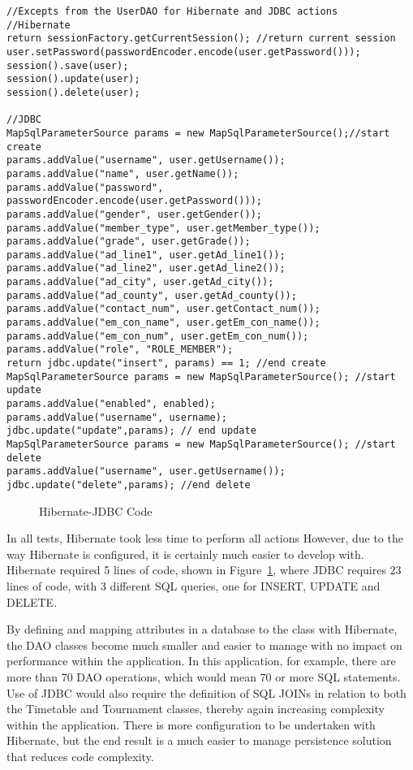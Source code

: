 \begin{lstlisting}
//Excepts from the UserDAO for Hibernate and JDBC actions
//Hibernate
return sessionFactory.getCurrentSession(); //return current session
user.setPassword(passwordEncoder.encode(user.getPassword()));
session().save(user);
session().update(user);	
session().delete(user);

//JDBC
MapSqlParameterSource params = new MapSqlParameterSource();//start create
params.addValue("username", user.getUsername());
params.addValue("name", user.getName());
params.addValue("password", passwordEncoder.encode(user.getPassword()));
params.addValue("gender", user.getGender());
params.addValue("member_type", user.getMember_type());
params.addValue("grade", user.getGrade());
params.addValue("ad_line1", user.getAd_line1());
params.addValue("ad_line2", user.getAd_line2());
params.addValue("ad_city", user.getAd_city());
params.addValue("ad_county", user.getAd_county());
params.addValue("contact_num", user.getContact_num());
params.addValue("em_con_name", user.getEm_con_name());
params.addValue("em_con_num", user.getEm_con_num());
params.addValue("role", "ROLE_MEMBER");
return jdbc.update("insert", params) == 1; //end create
MapSqlParameterSource params = new MapSqlParameterSource(); //start update
params.addValue("enabled", enabled);
params.addValue("username", username);
jdbc.update("update",params); // end update
MapSqlParameterSource params = new MapSqlParameterSource(); //start delete
params.addValue("username", user.getUsername());
jdbc.update("delete",params); //end delete
\end{lstlisting}
\begin{figure}[H]
\caption{Hibernate-JDBC Code}
\label{fig:jdbchibcode}
\end{figure}

In all tests, Hibernate took less time to perform all actions However, due to the way Hibernate is configured, it is certainly much easier to develop with. Hibernate required 5 lines of code, shown in Figure~\ref{fig:jdbchibcode}, where JDBC requires 23 lines of code, with 3 different SQL queries, one for INSERT, UPDATE and DELETE. 

By defining and mapping attributes in a database to the class with Hibernate, the DAO classes become much smaller and easier to manage with no impact on performance within the application. In this application, for example, there are more than 70 DAO operations, which would mean 70 or more SQL statements. Use of JDBC would also require the definition of SQL JOINs in relation to both the Timetable and Tournament classes, thereby again increasing complexity within the application. There is more configuration to be undertaken with Hibernate, but the end result is a much easier to manage persistence solution that reduces code complexity.


